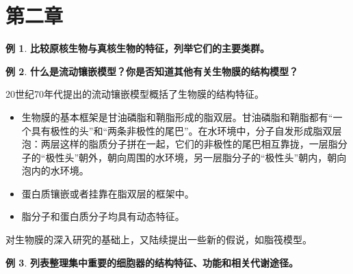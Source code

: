 \documentclass[UTF8]{article}
\theoremstyle{definition}
\newtheorem{example}{例}[section]
\begin{document}
\section{第二章}\begin{example}\textbf{比较原核生物与真核生物的特征，列举它们的主要类群。}
    
\end{example}\begin{example}\textbf{什么是流动镶嵌模型？你是否知道其他有关生物膜的结构模型？}
    
    20世纪70年代提出的流动镶嵌模型概括了生物膜的结构特征。\begin{itemize}
        \item 生物膜的基本框架是甘油磷脂和鞘脂形成的脂双层。甘油磷脂和鞘脂都有“一个具有极性的头”和“两条非极性的尾巴”。在水环境中，分子自发形成脂双层泡：两层这样的脂质分子拼在一起，它们的非极性的尾巴相互靠拢，一层脂分子的“极性头”朝外，朝向周围的水环境，另一层脂分子的“极性头”朝内，朝向泡内的水环境。
        \item 蛋白质镶嵌或者挂靠在脂双层的框架中。
        \item 脂分子和蛋白质分子均具有动态特征。
    \end{itemize}
    对生物膜的深入研究的基础上，又陆续提出一些新的假说，如脂筏模型。
\end{example}\begin{example}\textbf{列表整理集中重要的细胞器的结构特征、功能和相关代谢途径。}


\end{example}
\end{document}
